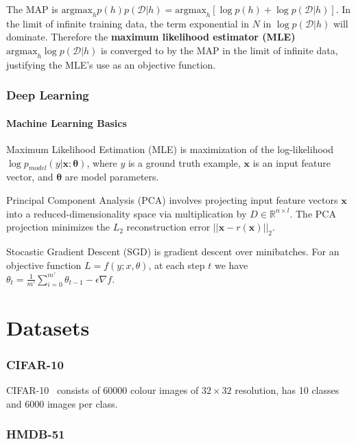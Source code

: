 \documentclass[a4paper, 12pt]{article}
\begin{document}
The MAP is
$\textrm{argmax}_h p(h) p(\mathcal{D} | h) = \textrm{argmax}_h \left[ \log{p(h)} + \log{p(\mathcal{D} | h)} \right]$.
In the limit of infinite training data, the term exponential in $N$ in
$\log{p(\mathcal{D} | h)}$ will dominate. Therefore the
\textbf{maximum likelihood estimator (MLE)}
$\textrm{argmax}_h \log{p(\mathcal{D} | h)}$ is converged to by the MAP in the
limit of infinite data, justifying the MLE's use as an objective function.


\section{Deep Learning~\citet{Goodfellow-et-al-2016-Book}}


\subsection{Machine Learning Basics}

Maximum Likelihood Estimation (MLE) is maximization of the log-likelihood
$\log p_{model}(y | \mathbf{x}; \mathbf{\theta})$, where $y$ is a ground truth
example, $\mathbf{x}$ is an input feature vector, and $\mathbf{\theta}$ are
model parameters.

Principal Component Analysis (PCA) involves projecting input feature vectors
$\mathbf{x}$ into a reduced-dimensionality space via multiplication by
$D \in \mathbb{R}^{n \times l}$. The PCA projection minimizes the $L_2$
reconstruction error $||\mathbf{x} - r(\mathbf{x})||_2$.

Stocastic Gradient Descent (SGD) is gradient descent over minibatches. For an
objective function $L = f(y; x, \theta)$, at each step $t$ we have
$\theta_t = \frac{1}{m'} \sum_{i = 0}^{m'} \theta_{t - 1} - \epsilon \nabla f$.


\part{Datasets}


\section{CIFAR-10~\citet{cifar10-website}}
\label{cifar10}

CIFAR-10~\citet{cifar10-website} consists of \num{60000} colour images of $32
\times 32$ resolution, has 10 classes and \num{6000} images per class.


\section{HMDB-51~\citet{Kuehne11}}
\label{hmdb51}
\end{document}

